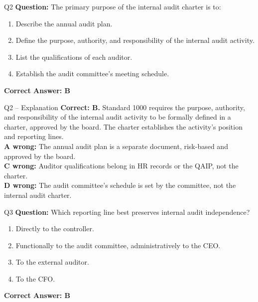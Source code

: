 \documentclass[aspectratio=169,10pt]{beamer}
\begin{document}
	\begin{frame}[t]{Q2}
		\small
		\textbf{Question:} The primary purpose of the internal audit charter is to:
		\begin{enumerate}[label=\Alph*.,itemsep=1pt,topsep=2pt]
			\item Describe the annual audit plan.
			\item Define the purpose, authority, and responsibility of the internal audit activity.
			\item List the qualifications of each auditor.
			\item Establish the audit committee's meeting schedule.
		\end{enumerate}
		\vspace{4pt}
		\textbf{Correct Answer: B}
	\end{frame}
	
	\begin{frame}[t]{Q2 -- Explanation}
		\small
		\textbf{Correct: B.} Standard 1000 requires the purpose, authority, and responsibility of the internal audit activity to be formally defined in a charter, approved by the board. The charter establishes the activity's position and reporting lines. \\[4pt]
		\textbf{A wrong:} The annual audit plan is a separate document, risk-based and approved by the board. \\[2pt]
		\textbf{C wrong:} Auditor qualifications belong in HR records or the QAIP, not the charter. \\[2pt]
		\textbf{D wrong:} The audit committee's schedule is set by the committee, not the internal audit charter.
	\end{frame}
	
	\begin{frame}[t]{Q3}
		\small
		\textbf{Question:} Which reporting line best preserves internal audit independence?
		\begin{enumerate}[label=\Alph*.,itemsep=1pt,topsep=2pt]
			\item Directly to the controller.
			\item Functionally to the audit committee, administratively to the CEO.
			\item To the external auditor.
			\item To the CFO.
		\end{enumerate}
		\vspace{4pt}
		\textbf{Correct Answer: B}
	\end{frame}
	
\end{document}
